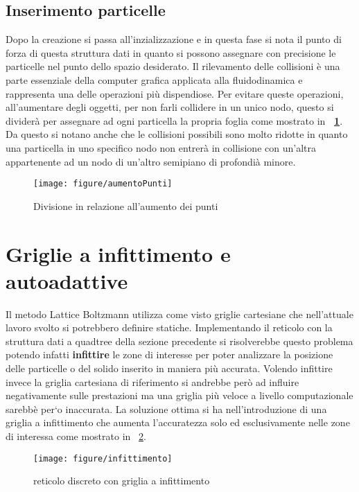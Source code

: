 \subsection{Inserimento particelle}
Dopo la creazione si passa all'inzializzazione e in questa fase si nota il punto di forza di questa struttura dati in quanto si possono assegnare con precisione le particelle nel punto dello spazio desiderato. 
Il rilevamento delle collisioni \`e una parte essenziale della computer grafica applicata alla fluidodinamica e rappresenta una delle operazioni pi\`u dispendiose. Per evitare queste operazioni, all'aumentare degli oggetti, per non farli collidere in un unico nodo, questo si divider\`a per assegnare ad ogni particella la propria foglia come mostrato in \textbf{\figurename~\ref{fig:aumentoPunti}}. Da questo si notano anche che le collisioni possibili sono molto ridotte in quanto una particella in uno specifico nodo non entrer\`a in collisione con un'altra appartenente ad un nodo di un'altro semipiano di profondi\`a minore.

\begin{figure}[!htb]
	\begin{center}
		\texttt{[image: figure/aumentoPunti]}
	\end{center}
	\caption{Divisione in relazione all'aumento dei punti \label{fig:aumentoPunti}}
\end{figure}\hfill

\section{Griglie a infittimento e autoadattive}
Il metodo Lattice Boltzmann utilizza come visto griglie cartesiane che nell'attuale lavoro svolto si potrebbero definire statiche. Implementando il reticolo con la struttura dati a quadtree della sezione precedente si risolverebbe questo problema potendo infatti \textbf{infittire} le zone di interesse per poter analizzare la posizione delle particelle o del solido inserito in maniera pi\`u accurata. Volendo infittire invece la griglia cartesiana di riferimento si andrebbe per\`o ad influire negativamente sulle prestazioni ma una griglia pi\`u veloce a livello computazionale sarebb\`e per`o inaccurata. La soluzione ottima si ha nell'introduzione di una griglia a infittimento che aumenta l'accuratezza solo ed esclusivamente nelle zone di interessa come mostrato in \figurename~\ref{fig:infittimento}.
\begin{figure}[!htb]
	\begin{center}
		\texttt{[image: figure/infittimento]}
	\end{center}
	\caption{reticolo discreto con griglia a infittimento \label{fig:infittimento}}
\end{figure}\hfill

